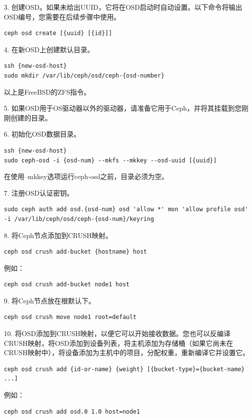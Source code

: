 \documentclass[12pt,UTF8]{ctexbook}
\begin{document}
3. 创建OSD。如果未给出UUID，它将在OSD启动时自动设置。以下命令将输出OSD编号，您需要在后续步骤中使用。
\begin{verbatim}
ceph osd create [{uuid} [{id}]]
\end{verbatim}

4. 在新OSD上创建默认目录。
\begin{verbatim}
ssh {new-osd-host}
sudo mkdir /var/lib/ceph/osd/ceph-{osd-number}
\end{verbatim}

以上是FreeBSD的ZFS指令。

5. 如果OSD用于OS驱动器以外的驱动器，请准备它用于Ceph，并将其挂载到您刚刚创建的目录。

6. 初始化OSD数据目录。
\begin{verbatim}
ssh {new-osd-host}
sudo ceph-osd -i {osd-num} --mkfs --mkkey --osd-uuid [{uuid}]
\end{verbatim}

在使用--mkkey选项运行ceph-osd之前，目录必须为空。

7. 注册OSD认证密钥。
\begin{verbatim}
sudo ceph auth add osd.{osd-num} osd 'allow *' mon 'allow profile osd' -i /var/lib/ceph/osd/ceph-{osd-num}/keyring
\end{verbatim}

8. 将Ceph节点添加到CRUSH映射。
\begin{verbatim}
ceph osd crush add-bucket {hostname} host
\end{verbatim}

例如：
\begin{verbatim}
ceph osd crush add-bucket node1 host
\end{verbatim}

9. 将Ceph节点放在根默认下。
\begin{verbatim}
ceph osd crush move node1 root=default
\end{verbatim}

10. 将OSD添加到CRUSH映射，以便它可以开始接收数据。您也可以反编译CRUSH映射，将OSD添加到设备列表，将主机添加为存储桶（如果它尚未在CRUSH映射中），将设备添加为主机中的项目，分配权重，重新编译它并设置它。
\begin{verbatim}
ceph osd crush add {id-or-name} {weight} [{bucket-type}={bucket-name} ...]
\end{verbatim}

例如：
\begin{verbatim}
ceph osd crush add osd.0 1.0 host=node1
\end{verbatim}
\end{document}
